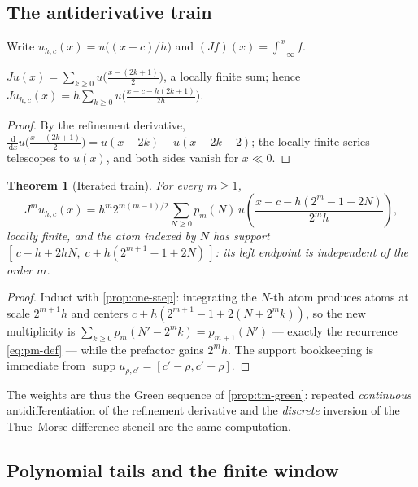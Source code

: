 \documentclass[11pt,oneside]{article}
\numberwithin{equation}{section}
\newtheorem{theorem}{Theorem}[section]
\theoremstyle{definition}
\theoremstyle{remark}
\newcommand{\dd}{\,\mathrm d}
\newcommand{\supp}{\operatorname{supp}}
\begin{document}
\subsection{The antiderivative train}

Write $u_{h,c}(x)=u\bigl((x-c)/h\bigr)$ and
$(Jf)(x)=\int_{-\infty}^{x}f$.

\begin{proposition}
\label{prop:one-step}
$Ju(x)=\sum_{k\ge0}u\bigl(\tfrac{x-(2k+1)}2\bigr)$, a locally finite
sum; hence
$Ju_{h,c}(x)=h\sum_{k\ge0}
u\bigl(\tfrac{x-c-h(2k+1)}{2h}\bigr)$.
\end{proposition}

\begin{proof}
By the refinement derivative,
$\tfrac{\dd}{\dd x}u\bigl(\tfrac{x-(2k+1)}2\bigr)
=u(x-2k)-u(x-2k-2)$; the locally finite series telescopes to $u(x)$,
and both sides vanish for $x\ll0$.
\end{proof}

\begin{theorem}[Iterated train]
\label{thm:iterated-J}
For every $m\ge1$,
\begin{equation}
 \boxed{\;
 J^{m}u_{h,c}(x)
 =h^{m}2^{m(m-1)/2}
 \sum_{N\ge0}p_m(N)\,
 u\!\left(\frac{x-c-h(2^{m}-1+2N)}{2^{m}h}\right),
 \;}
 \label{eq:iterated-J}
\end{equation}
locally finite, and the atom indexed by $N$ has support
$[\,c-h+2hN,\;c+h(2^{m+1}-1+2N)\,]$: its \emph{left} endpoint is
independent of the order $m$.
\end{theorem}

\begin{proof}
Induct with \cref{prop:one-step}: integrating the $N$-th atom
produces atoms at scale $2^{m+1}h$ and centers
$c+h(2^{m+1}-1+2(N+2^{m}k))$, so the new multiplicity is
$\sum_{k\ge0}p_m(N'-2^{m}k)=p_{m+1}(N')$ --- exactly the recurrence
\eqref{eq:pm-def} --- while the prefactor gains $2^{m}h$.  The
support bookkeeping is immediate from
$\supp u_{\rho,c'}=[c'-\rho,c'+\rho]$.
\end{proof}

The weights are thus the Green sequence of
\cref{prop:tm-green}: repeated \emph{continuous} antidifferentiation
of the refinement derivative and the \emph{discrete} inversion of the
Thue--Morse difference stencil are the same computation.

\subsection{Polynomial tails and the finite window}
\end{document}

